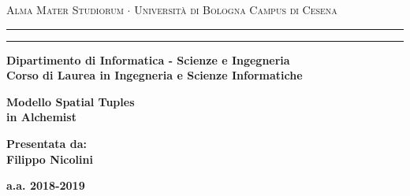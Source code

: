 \documentclass[12pt,a4paper]{report}
\begin{document}
\begin{titlepage}
\begin{center}
{{\Large{\textsc{Alma Mater Studiorum $\cdot$ Universit\`a di Bologna}}}}
{\small{\textsc{Campus di Cesena}}}
\rule[0.1cm]{15.8cm}{0.1mm}
\rule[0.5cm]{15.8cm}{0.6mm}
{\small{\bf Dipartimento di Informatica - Scienze e Ingegneria}}
\\
\medskip
{\small{\bf Corso di Laurea in Ingegneria e Scienze Informatiche}}
\end{center}
\vspace{15mm}
\begin{center}
{\LARGE{\bf Modello Spatial Tuples}}\\
\vspace{3mm}
{\LARGE{\bf in Alchemist}}\\
\end{center}
\vspace{40mm}
\par
\noindent
\begin{minipage}[t]{0.47\textwidth}
\end{minipage}
\hfill
\begin{minipage}[t]{0.47\textwidth}\raggedleft
{\large{\bf Presentata da:\\
Filippo Nicolini}}
\end{minipage}
\vspace{20mm}
\begin{center}
{\large{\bf
a.a. 2018-2019 }}%
\end{center}
\end{titlepage}
\end{document}
